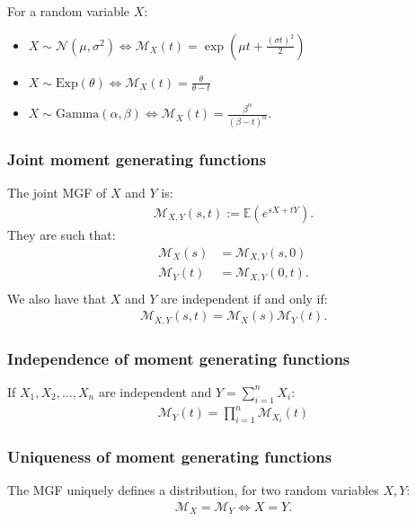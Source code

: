 \documentclass[a4paper, 12pt, twoside]{article}
\begin{document}
For a random variable $X$:

\begin{itemize}
    \item $X \sim \mathcal{N}(\mu, \sigma^2) \Leftrightarrow
              \mathcal{M}_X(t) = \exp{(\mu t + \frac{(\sigma t)^2}{2})}$
    \item $X \sim \text{Exp}(\theta) \Leftrightarrow
              \mathcal{M}_X(t) = \frac{\theta}{\theta - t}$
    \item $X \sim \text{Gamma}(\alpha, \beta) \Leftrightarrow
              \mathcal{M}_X(t) = \frac{\beta^\alpha}{(\beta - t)^\alpha}$.
\end{itemize}

\subsubsection{Joint moment generating functions}

The joint MGF of $X$ and $Y$ is:
\begin{align*}
    \mathcal{M}_{X, Y}(s, t) := \mathbb{E}(e^{sX + tY}).
\end{align*}
They are such that:
\begin{align*}
    \mathcal{M}_X(s) & = \mathcal{M}_{X, Y}(s, 0)  \\
    \mathcal{M}_Y(t) & = \mathcal{M}_{X, Y}(0, t). \\
\end{align*}
We also have that $X$ and $Y$ are independent if and only if:
\begin{align*}
    \mathcal{M}_{X, Y}(s, t) = \mathcal{M}_X(s)\mathcal{M}_Y(t).
\end{align*}

\subsubsection{Independence of moment generating functions}

If $X_1, X_2, \ldots, X_n$ are independent and $Y = \sum_{i = 1}^n X_i$:
\begin{align*}
    \mathcal{M}_Y(t) = \prod_{i = 1}^n \mathcal{M}_{X_i}(t)
\end{align*}

\subsubsection{Uniqueness of moment generating functions}

The MGF uniquely defines a distribution, for two random variables $X, Y$:
\begin{align*}
    \mathcal{M}_X = \mathcal{M}_Y \Leftrightarrow X = Y.
\end{align*}
\end{document}
